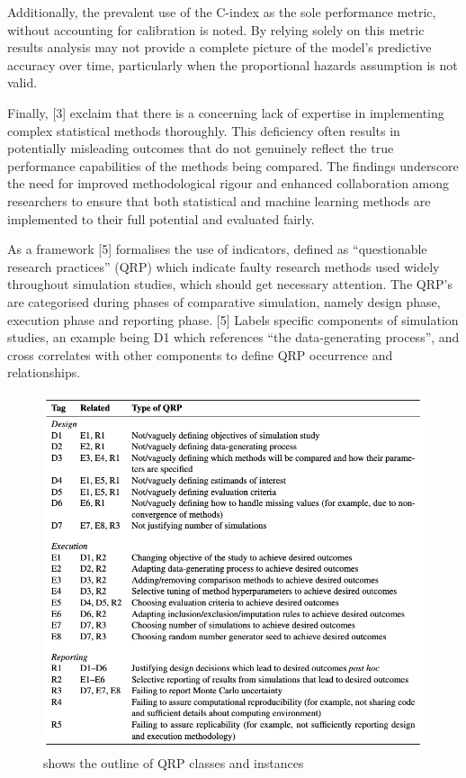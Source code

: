 Additionally, the prevalent use of the C-index as the sole performance metric, without accounting for calibration is noted. By relying solely on this metric results analysis may not provide a complete picture of the model's predictive accuracy over time, particularly when the proportional hazards assumption is not valid.

Finally, [3] exclaim that there is a concerning lack of expertise in implementing complex statistical methods thoroughly. This deficiency often results in potentially misleading outcomes that do not genuinely reflect the true performance capabilities of the methods being compared. The findings underscore the need for improved methodological rigour and enhanced collaboration among researchers to ensure that both statistical and machine learning methods are implemented to their full potential and evaluated fairly.

As a framework [5] formalises the use of indicators, defined as “questionable research practices” (QRP) which indicate faulty research methods used widely throughout simulation studies, which should get necessary attention. The QRP’s are categorised during phases of comparative simulation, namely design phase, execution phase and reporting phase. [5] Labels specific components of simulation studies, an example being D1 which references 
“the data-generating process”, and cross correlates with other components to define QRP occurrence and relationships.

\begin{figure}[h]
	\includegraphics[scale=0.5]{Figures/screenshots/QRPSUMMARY.png}
	\caption{shows the outline of QRP classes and instances}
\end{figure}

